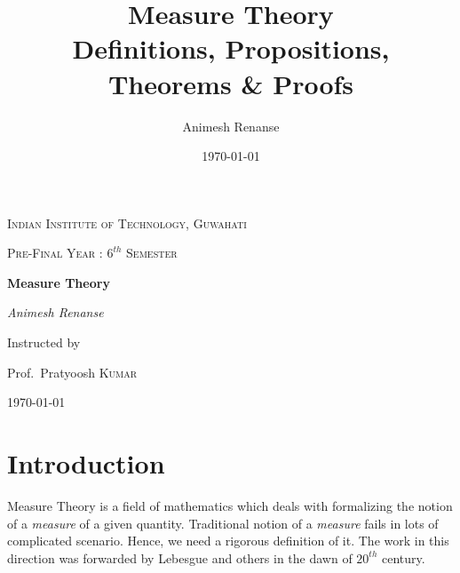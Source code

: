\documentclass{article}
\title{\Huge Measure Theory\\
	\Large Definitions, Propositions, Theorems \& Proofs}
\author{Animesh Renanse}
\date{\today}
\theoremstyle{definition}
\theoremstyle{remark}
\theoremstyle{definition}
\theoremstyle{definition}
\theoremstyle{definition}
\begin{document}
\begin{titlepage}
	{\scshape\LARGE Indian Institute of Technology, Guwahati \par}
	\vspace{1cm}
	{\scshape\Large Pre-Final Year : $ 6^{th} $ Semester\par}
	\vspace{1.5cm}
	{\Huge\bfseries Measure Theory\par}
	\vspace{2cm}
	{\Large\itshape Animesh Renanse\par}
	\vfill
	Instructed by\par
	Prof.~Pratyoosh \textsc{Kumar}
	
	\vfill
	
	{\large \today\par}
\end{titlepage}
\tableofcontents
\newpage
\section{Introduction}
Measure Theory is a field of mathematics which deals with formalizing the notion of a \emph{measure} of a given quantity. Traditional notion of a \emph{measure} fails in lots of complicated scenario. Hence, we need a rigorous definition of it. The work in this direction was forwarded by Lebesgue and others in the dawn of $ 20^{th} $ century.
\end{document}

